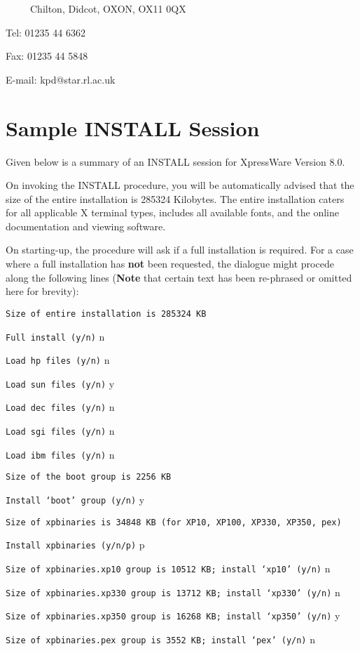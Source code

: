 \ \ \ \ \ Chilton, Didcot, OXON, OX11 0QX

Tel: 01235 44 6362

Fax: 01235 44 5848

E-mail: kpd@star.rl.ac.uk

\clearpage

\appendix

\section {Sample INSTALL Session}

Given below is a summary of an INSTALL session for XpressWare Version 8.0.

On invoking the INSTALL procedure, you will be automatically advised that the
size of the entire installation is 285324 Kilobytes. The entire installation
caters for all applicable X terminal types, includes all available fonts, and
the online documentation and viewing software.

On starting-up, the procedure will ask if a full installation is required. For
a case where a full installation has {\bf not} been requested, the dialogue
might procede along the following lines ({\bf Note} that certain text has been
re-phrased or omitted here for brevity):

{\tt Size of entire installation is 285324 KB}

{\tt Full install (y/n)} n

{\tt Load hp files (y/n)} n

{\tt Load sun files (y/n)} y

{\tt Load dec files (y/n)} n

{\tt Load sgi files (y/n)} n

{\tt Load ibm files (y/n)} n

{\tt Size of the boot group is 2256 KB}

{\tt Install `boot' group (y/n)} y

{\tt Size of xpbinaries is 34848 KB (for XP10, XP100, XP330, XP350, pex)}

{\tt Install xpbinaries (y/n/p)} p

{\tt Size of xpbinaries.xp10 group is 10512 KB; install `xp10' (y/n)} n

{\tt Size of xpbinaries.xp330 group is 13712 KB; install `xp330' (y/n)} n

{\tt Size of xpbinaries.xp350 group is 16268 KB; install `xp350' (y/n)} y

{\tt Size of xpbinaries.pex group is 3552 KB; install `pex' (y/n)} n

